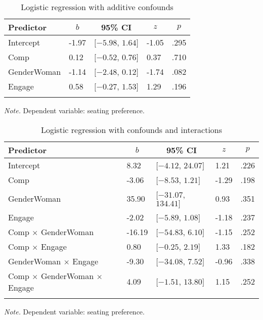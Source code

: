 \documentclass[man]{apa6}
\begin{document}
\begin{table}[tbp]
\begin{center}
\begin{threeparttable}
\caption{\label{tab:Additive model}Logistic regression with additive confounds}
\begin{tabular}{lllll}
\toprule
Predictor & \multicolumn{1}{c}{$b$} & \multicolumn{1}{c}{95\% CI} & \multicolumn{1}{c}{$z$} & \multicolumn{1}{c}{$p$}\\
\midrule
Intercept & -1.97 & $[-5.98$, $1.64]$ & -1.05 & .295\\
Comp & 0.12 & $[-0.52$, $0.76]$ & 0.37 & .710\\
GenderWoman & -1.14 & $[-2.48$, $0.12]$ & -1.74 & .082\\
Engage & 0.58 & $[-0.27$, $1.53]$ & 1.29 & .196\\
\bottomrule
\addlinespace
\end{tabular}
\begin{tablenotes}[para]
\normalsize{\textit{Note.} Dependent variable: seating preference.}
\end{tablenotes}
\end{threeparttable}
\end{center}
\end{table}

\begin{table}[tbp]
\begin{center}
\begin{threeparttable}
\caption{\label{tab:Multiplicative model}Logistic regression with confounds and interactions}
\begin{tabular}{lllll}
\toprule
Predictor & \multicolumn{1}{c}{$b$} & \multicolumn{1}{c}{95\% CI} & \multicolumn{1}{c}{$z$} & \multicolumn{1}{c}{$p$}\\
\midrule
Intercept & 8.32 & $[-4.12$, $24.07]$ & 1.21 & .226\\
Comp & -3.06 & $[-8.53$, $1.21]$ & -1.29 & .198\\
GenderWoman & 35.90 & $[-31.07$, $134.41]$ & 0.93 & .351\\
Engage & -2.02 & $[-5.89$, $1.08]$ & -1.18 & .237\\
Comp $\times$ GenderWoman & -16.19 & $[-54.83$, $6.10]$ & -1.15 & .252\\
Comp $\times$ Engage & 0.80 & $[-0.25$, $2.19]$ & 1.33 & .182\\
GenderWoman $\times$ Engage & -9.30 & $[-34.08$, $7.52]$ & -0.96 & .338\\
Comp $\times$ GenderWoman $\times$ Engage & 4.09 & $[-1.51$, $13.80]$ & 1.15 & .252\\
\bottomrule
\addlinespace
\end{tabular}
\begin{tablenotes}[para]
\normalsize{\textit{Note.} Dependent variable: seating preference.}
\end{tablenotes}
\end{threeparttable}
\end{center}
\end{table}
\end{document}
